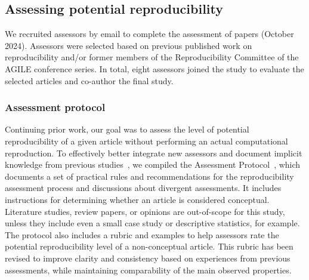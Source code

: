 \documentclass{josis}
\begin{document}
\subsection{Assessing potential reproducibility}
\label{sec:methods:assessment}

We recruited assessors by email to complete the assessment of papers (October 2024). Assessors were selected based on previous published work on reproducibility and/or former members of the Reproducibility Committee of the AGILE conference series. In total, eight assessors joined the study to evaluate the selected articles and co-author the final study.

\subsubsection{Assessment protocol}
\label{sec:methods:assessment:protocol}

Continuing prior work, our goal was to assess the level of potential reproducibility of a given article without performing an actual computational reproduction. To effectively better integrate new assessors and document implicit knowledge from previous studies~\cite{nust2018, ostermann2021}, we compiled the Assessment Protocol~\cite{assessment_protocol}, which documents a set of practical rules and recommendations for the reproducibility assessment process and discussions about divergent assessments.
It includes instructions for determining whether an article is considered conceptual. Literature studies, review papers, or opinions are out-of-scope for this study, unless they include even a small case study or descriptive statistics, for example.
The protocol also includes a rubric and examples to help assessors rate the potential reproducibility level of a non-conceptual article. This rubric has been revised to improve clarity and consistency based on experiences from previous assessments, while maintaining comparability of the main observed properties.
\end{document}
